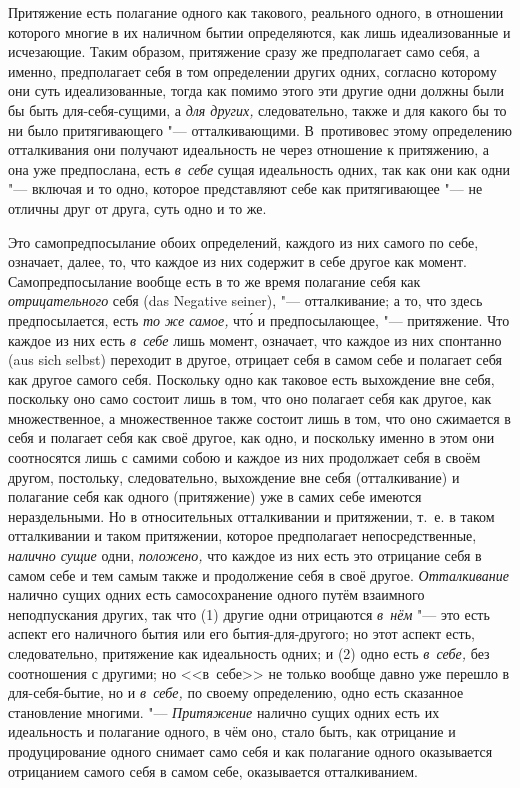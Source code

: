 Притяжение есть полагание одного как такового, реального одного, в отношении
которого многие в их наличном бытии определяются, как лишь идеализованные и
исчезающие. Таким образом, притяжение сразу же предполагает само себя, а
именно, предполагает себя в том определении других одних, согласно которому
они суть идеализованные, тогда как помимо этого эти другие одни должны были
бы быть для-себя-сущими, а {\em для других,}
следовательно, также и для какого бы то ни было притягивающего
"--- отталкивающими. В~противовес этому определению отталкивания они получают
идеальность не через отношение к притяжению, а она уже предпослана, есть
{\em в~себе} сущая идеальность одних, так как они как одни "--- включая
и то одно, которое представляют себе как притягивающее "--- не
отличны друг от друга, суть одно и то же.

Это самопредпосылание обоих определений, каждого из них самого по себе,
означает, далее, то, что каждое из них содержит в себе другое как момент.
Самопредпосылание вообще есть в то же время полагание себя как
{\em отрицательного} себя (das Negative seiner), "---
отталкивание; а то, что здесь предпосылается, есть
{\em то же самое,} чт\'{о} и предпосылающее, "--- притяжение.
Что каждое из них есть {\em в~себе} лишь момент,
означает, что каждое из них спонтанно (aus sich selbst) переходит в
другое, отрицает себя в самом себе и полагает себя как другое самого себя.
Поскольку одно как таковое есть выхождение вне себя, поскольку оно само
состоит лишь в том, что оно полагает себя как другое, как множественное, а
множественное также состоит лишь в том, что оно сжимается в себя и полагает
себя как своё другое, как одно, и поскольку именно в этом они соотносятся
лишь с самими собою и каждое из них продолжает себя в своём другом,
постольку, следовательно, выхождение вне себя (отталкивание) и полагание
себя как одного (притяжение) уже в самих себе имеются нераздельными. Но в
относительных отталкивании и притяжении, т.~е. в таком отталкивании и таком
притяжении, которое предполагает непосредственные, {\em налично сущие} одни,
{\em положено,} что каждое из них есть это отрицание
себя в самом себе и тем самым также и продолжение себя в своё другое.
{\em Отталкивание} налично сущих одних есть
самосохранение одного путём взаимного неподпускания других, так что (1)
другие одни отрицаются {\em в~нём} "--- это есть аспект
его наличного бытия или его бытия-для-другого; но этот аспект есть,
следовательно, притяжение как идеальность одних; и (2) одно есть
{\em в~себе,} без соотношения с другими; но <<в~себе>> не
только вообще давно уже перешло в для-себя-бытие, но и
{\em в~себе,} по своему определению, одно есть
сказанное становление многими. "--- {\em Притяжение}
налично сущих одних есть их идеальность и полагание одного, в чём оно,
стало быть, как отрицание и продуцирование одного снимает само себя и как
полагание одного оказывается отрицанием самого себя в самом себе,
оказывается отталкиванием.

